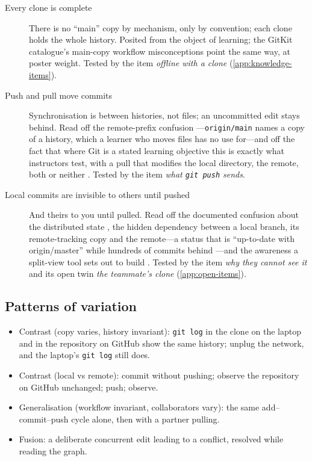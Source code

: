 \begin{description}
  \item[Every clone is complete]
    There is no \enquote{main} copy by mechanism, only by convention;
    each clone holds the whole history.
    Posited from the object of learning; the GitKit catalogue's
    main-copy workflow misconceptions \autocite{Postner2026GitMisconceptions}
    point the same way, at poster weight.
    Tested by the item \emph{offline with a clone}
    (\cref{app:knowledge-items}).
  \item[Push and pull move commits]
    Synchronisation is between histories, not files; an uncommitted
    edit stays behind.
    Read off the remote-prefix confusion
    \autocite[Sec.~5.4]{IsomottonenCochez2014}---\texttt{origin/main} names
    a copy of a history, which a learner who moves files has no use
    for---and off the fact that where Git is a stated learning objective
    this is exactly what instructors test, with a pull that modifies
    the local directory, the remote, both or neither
    \autocite{Beckman2021GitLearningObjective}.
    Tested by the item \emph{what \texttt{git push} sends}.
  \item[Local commits are invisible to others until pushed]
    And theirs to you until pulled.
    Read off the documented confusion about the distributed state
    \autocite{IsomottonenCochez2014}, the hidden dependency between a
    local branch, its remote-tracking copy and the remote---a status that
    is \enquote{up-to-date with origin/master} while hundreds of commits
    behind \autocite{Church2014HiddenDependencies}---and the awareness a
    split-view tool sets out to build \autocite{Bucher2026GitTakesTwo}.
    Tested by the item \emph{why they cannot see it} and its open twin
    \emph{the teammate's clone} (\cref{app:open-items}).
\end{description}

\subsection{Patterns of variation}

\begin{itemize}
  \item Contrast (copy varies, history invariant): \texttt{git log} in
    the clone on the laptop and in the repository on GitHub show the
    same history; unplug the network, and the laptop's \texttt{git log}
    still does.
  \item Contrast (local vs remote): commit without pushing; observe the
    repository on GitHub unchanged; push; observe.
  \item Generalisation (workflow invariant, collaborators vary): the same
    add--commit--push cycle alone, then with a partner pulling.
  \item Fusion: a deliberate concurrent edit leading to a conflict,
    resolved while reading the graph.
\end{itemize}
